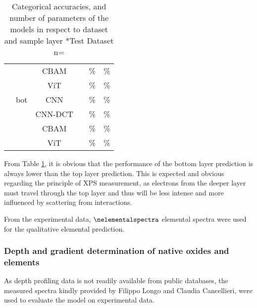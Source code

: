 \begin{table}[H]
\begin{tabular}{c|c|c|c|c|c}
                &       & CBAM    &                &       \%              &         \% \\
                &       & ViT     &                &       \%              &         \% \\
                & bot   & CNN     &                &       \%              &          \%  \\
                &       & CNN-DCT &                &       \%              &          \%  \\
                &       & CBAM    &                &       \%              &         \% \\
                &       & ViT     &                &       \%              &           \% \\
    \end{tabular}
    \caption{Categorical accuracies, and number of parameters of the models in respect to dataset and sample layer
    *Test Dataset n=\nelementalspectra}
    \label{tab:acc_qual}
\end{table}

From Table \ref{tab:acc_qual}, it is obvious that the performance of the bottom layer prediction is always lower than the top layer prediction. This is expected and obvious regarding the principle of XPS measurement, as electrons from the deeper layer must travel through the top layer and thus will be less intense and more influenced by scattering from interactions.

From the experimental data, $\nelementalspectra$ elemental spectra were used for the qualitative elemental prediction. 

\subsubsection{Depth and gradient determination of native oxides and elements}
As depth profiling data is not readily available from public databases, the measured spectra kindly provided by Filippo Longo and Claudia Cancellieri, were used to evaluate the model on experimental data.


